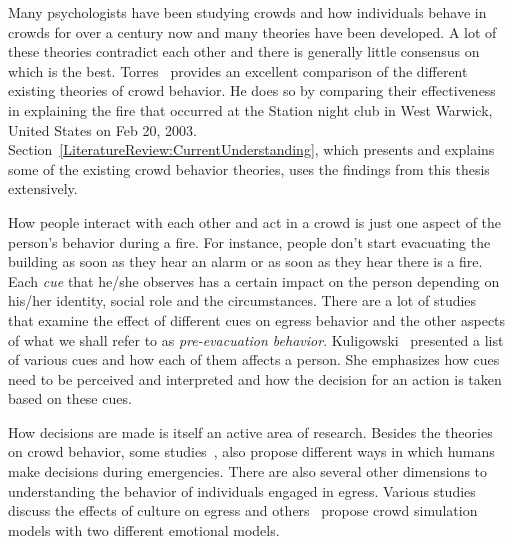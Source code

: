 Many psychologists have been studying crowds and how individuals behave in crowds for over a century now and many theories have been developed. A lot of these theories contradict each other and there is generally little consensus on which is the best. Torres~\cite{Torres:2010tj} provides an excellent comparison of the different existing theories of crowd behavior. He does so by comparing their effectiveness in explaining the fire that occurred at the Station night club in West Warwick, United States on Feb 20, 2003. Section~\ref{LiteratureReview:CurrentUnderstanding}, which presents and explains some of the existing crowd behavior theories, uses the findings from this thesis extensively.

How people interact with each other and act in a crowd is just one aspect of the person's behavior during a fire. For instance, people don't start evacuating the building as soon as they hear an alarm or as soon as they hear there is a fire. Each \emph{cue} that he/she observes has a certain impact on the person depending on his/her identity, social role and the circumstances. There are a lot of studies~\cite{Kuligowski:2009un,Ozel:2001tn,Torres:2010tj,Pires:2005gs,Sime:1983uy} that examine the effect of different cues on egress behavior and the other aspects of what we shall refer to as \emph{pre-evacuation behavior}. Kuligowski~\cite{Kuligowski:2009un} presented a list of various cues and how each of them affects a person. She emphasizes how cues need to be perceived and interpreted and how the decision for an action is taken based on these cues.

How decisions are made is itself an active area of research. Besides the theories on crowd behavior, some studies~\cite{Pires:2005gs, Ozel:2001tn}, also propose different ways in which humans make decisions during emergencies. There are also several other dimensions to understanding the behavior of individuals engaged in egress. Various studies~\cite{Andree:2008td,Sandberg:1997tw,Kobes:2009jx} discuss the effects of culture on egress and others~\cite{Pelechano:2005vp,Aydt:2011wz} propose crowd simulation models with two different emotional models.

